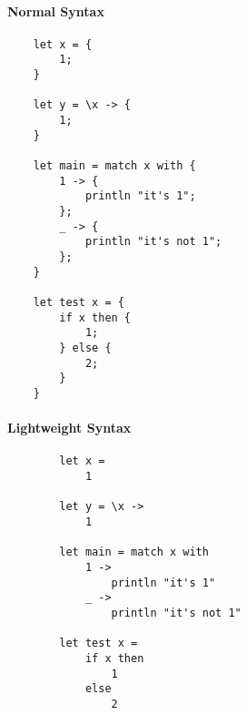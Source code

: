 \documentclass{article}
\begin{document}
\begin{paracol}{2}
    \paragraph{Normal Syntax}
    \begin{verbatim}
    let x = {
        1;
    }

    let y = \x -> {
        1;
    }
    
    let main = match x with {
        1 -> {
            println "it's 1";
        };
        _ -> {
            println "it's not 1";
        };
    }

    let test x = {
        if x then {
            1;
        } else {
            2;
        }
    }
    \end{verbatim}

    \switchcolumn{}
    \paragraph{Lightweight Syntax}
    \begin{verbatim}
        let x =
            1

        let y = \x ->
            1

        let main = match x with
            1 ->
                println "it's 1"
            _ ->
                println "it's not 1"

        let test x = 
            if x then 
                1
            else
                2
    \end{verbatim}
\end{paracol}
\end{document}

